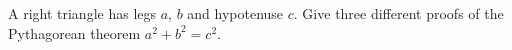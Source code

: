 A right triangle has legs $a$, $b$ and hypotenuse $c$. Give three different proofs of the Pythagorean theorem $a^2+b^2=c^2$.
